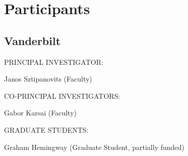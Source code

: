                \section{\textsf{Participants}}

               \subsection{Vanderbilt}

               \begin{indentation}{0pt}{0pt}{0pt}
                 \uppercase{PRINCIPAL INVESTIGATOR:}
               \end{indentation}
               
               \begin{indentation}{36pt}{0pt}{0pt}
                 Janos Sztipanovits (Faculty)
               \end{indentation}

               \begin{indentation}{0pt}{0pt}{0pt}
               \end{indentation}

               \begin{indentation}{0pt}{0pt}{0pt}
                 \uppercase{CO-PRINCIPAL INVESTIGATORS:}
               \end{indentation}

               \begin{indentation}{36pt}{0pt}{0pt}
                 Gabor Karsai (Faculty)
               \end{indentation}

               \begin{indentation}{0pt}{0pt}{0pt}
               \end{indentation}

               \begin{indentation}{0pt}{0pt}{0pt}
                 \uppercase{GRADUATE STUDENTS:}
               \end{indentation}

               \begin{indentation}{0pt}{0pt}{0pt}
               \end{indentation}

               \begin{indentation}{36pt}{0pt}{0pt}
                 Graham Hemingway (Graduate Student, partially funded)
               \end{indentation}

